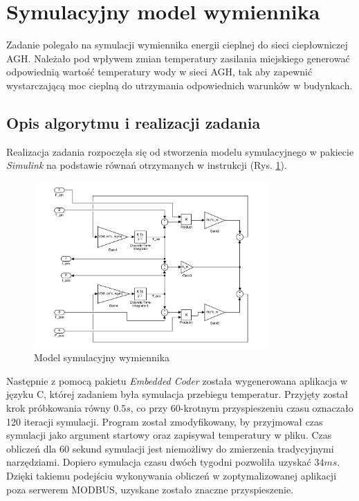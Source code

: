 \section{Symulacyjny model wymiennika}
Zadanie polegało na symulacji wymiennika energii cieplnej do sieci ciepłowniczej AGH. Należało pod wpływem zmian temperatury zasilania miejskiego generować odpowiednią wartość  temperatury wody w sieci AGH, tak aby zapewnić wystarczającą moc cieplną do utrzymania odpowiednich warunków w budynkach.
	\subsection{Opis algorytmu i realizacji zadania}
    Realizacja zadania rozpoczęła się od stworzenia modelu symulacyjnego w pakiecie \textit{Simulink} na podstawie równań otrzymanych w instrukcji (Rys. \ref{Wymiennik_Sim}).
    \begin{figure}[htb]
		\centerline{\includegraphics [width=0.8\textwidth,center] {Wymiennik_Sim.pdf}}
		\caption{Model symulacyjny wymiennika}
        \label{Wymiennik_Sim}
	\end{figure}
    Następnie z pomocą pakietu \textit{Embedded Coder} została wygenerowana aplikacja w języku C, której zadaniem była symulacja przebiegu temperatur. Przyjęty został krok próbkowania równy $0.5s$, co przy 60-krotnym przyspieszeniu czasu oznaczało 120 iteracji symulacji. Program został zmodyfikowany, by przyjmował czas symulacji jako argument startowy oraz zapisywał temperatury w pliku. Czas obliczeń dla 60 sekund symulacji jest niemożliwy do zmierzenia tradycyjnymi narzędziami. Dopiero symulacja czasu dwóch tygodni pozwoliła uzyskać $34ms$. Dzięki takiemu podejściu wykonywania obliczeń w zoptymalizowanej aplikacji poza serwerem MODBUS, uzyskane zostało znaczne przyspieszenie.
    
